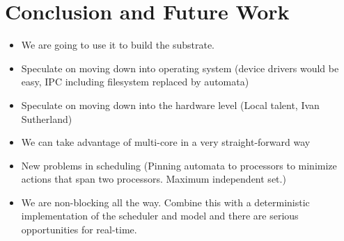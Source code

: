 \documentclass[letterpaper]{article}
\begin{document}
\section{Conclusion and Future Work\label{conclusion}}

\begin{itemize}
  \item We are going to use it to build the substrate.
  \item Speculate on moving down into operating system (device drivers would be easy, IPC including filesystem replaced by automata)
  \item Speculate on moving down into the hardware level (Local talent, Ivan Sutherland)
  \item We can take advantage of multi-core in a very straight-forward way
  \item New problems in scheduling (Pinning automata to processors to minimize actions that span two processors.  Maximum independent set.)
  \item We are non-blocking all the way.  Combine this with a deterministic implementation of the scheduler and model and there are serious opportunities for real-time.
\end{itemize}
\end{document}
